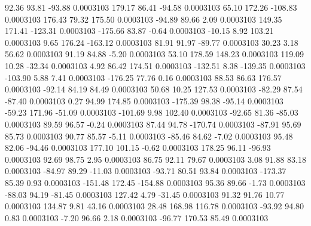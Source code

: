        92.36       93.81      -93.88     0.0003103
      179.17       86.41      -94.58     0.0003103
       65.10      172.26     -108.83     0.0003103
      176.43       79.32      175.50     0.0003103
      -94.89       89.66        2.09     0.0003103
      149.35      171.41     -123.31     0.0003103
     -175.66       83.87       -0.64     0.0003103
      -10.15        8.92      103.21     0.0003103
        9.65      176.24     -163.12     0.0003103
       81.91       91.97      -89.77     0.0003103
       30.23        3.18       56.62     0.0003103
       91.19       84.88       -5.20     0.0003103
       53.10      178.59      148.23     0.0003103
      119.09       10.28      -32.34     0.0003103
        4.92       86.42      174.51     0.0003103
     -132.51        8.38     -139.35     0.0003103
     -103.90        5.88        7.41     0.0003103
     -176.25       77.76        0.16     0.0003103
       88.53       86.63      176.57     0.0003103
      -92.14       84.19       84.49     0.0003103
       50.68       10.25      127.53     0.0003103
      -82.29       87.54      -87.40     0.0003103
        0.27       94.99      174.85     0.0003103
     -175.39       98.38      -95.14     0.0003103
      -59.23      171.96      -51.09     0.0003103
     -101.69        9.98      102.40     0.0003103
      -92.65       81.36      -85.03     0.0003103
       89.59       96.57       -0.24     0.0003103
       87.44       94.78     -170.74     0.0003103
      -87.91       95.69       85.73     0.0003103
       90.77       85.57       -5.11     0.0003103
      -85.46       84.62       -7.02     0.0003103
       95.48       82.06      -94.46     0.0003103
      177.10      101.15       -0.62     0.0003103
      178.25       96.11      -96.93     0.0003103
       92.69       98.75        2.95     0.0003103
       86.75       92.11       79.67     0.0003103
        3.08       91.88       83.18     0.0003103
      -84.97       89.29      -11.03     0.0003103
      -93.71       80.51       93.84     0.0003103
     -173.37       85.39        0.93     0.0003103
     -151.48      172.45     -154.88     0.0003103
       95.36       89.66       -1.73     0.0003103
      -88.03       94.19      -81.45     0.0003103
      127.42        4.79      -31.45     0.0003103
       91.32       91.76       10.77     0.0003103
      134.87        9.81       43.16     0.0003103
       28.48      168.98      116.78     0.0003103
      -93.92       94.80        0.83     0.0003103
       -7.20       96.66        2.18     0.0003103
      -96.77      170.53       85.49     0.0003103
